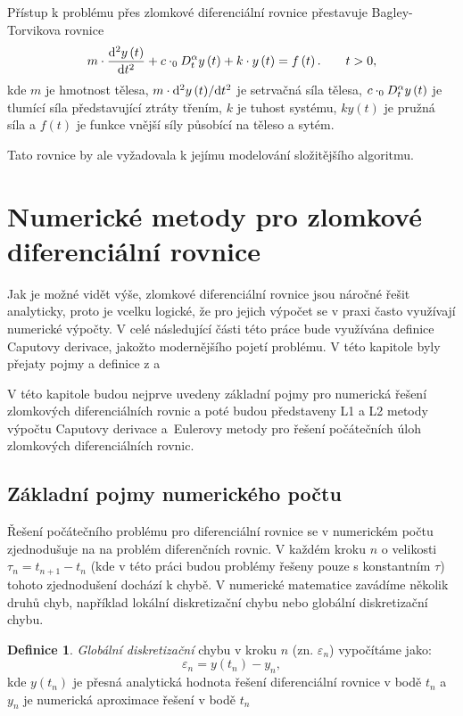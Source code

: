 \documentclass[a4paper,12pt,twoside]{article}
\theoremstyle{definition}
\newtheorem{defin}[veta]{Definice}
\theoremstyle{remark}
\numberwithin{equation}{section}
\numberwithin{table}{section}
\numberwithin{figure}{section}
\newcommand{\dx}[1]{\mathrm{d} #1}
\begin{document}
Přístup k problému přes zlomkové diferenciální rovnice přestavuje Bagley-Torvikova rovnice
\begin{equation}
	m\cdot \frac{\dx ^{2} y\left(t\right)}{\dx t^{2}} + c\cdot _{0}D^{\alpha}_{t} y\left(t\right) +k \cdot y\left(t\right) = f\left(t\right). \qquad t > 0,
\end{equation}
kde $m$ je hmotnost tělesa, $m\cdot {\dx ^{2} y\left(t\right)}/{\dx t^{2}}$ je setrvačná síla tělesa, $c\cdot \space _{0}D^{\alpha}_{t} y\left(t\right)$ je tlumící síla představující ztráty třením, $k$ je tuhost systému, $ky\left(t\right)$ je pružná síla a $f\left(t\right)$ je funkce vnější síly působící na těleso a sytém. \cite{ChenInMechanics}

Tato rovnice by ale vyžadovala k jejímu modelování složitějšího algoritmu.

\section{Numerické metody pro zlomkové diferenciální rovnice}
Jak je možné vidět výše, zlomkové diferenciální rovnice jsou náročné řešit analyticky, proto je vcelku logické, že pro jejich výpočet se v praxi často využívají numerické výpočty. V celé následující části této práce bude využívána definice Caputovy derivace, jakožto modernějšího pojetí problému. V této kapitole byly přejaty pojmy a definice z \cite{NumMetody} a \cite{Cangpin}

V této kapitole budou nejprve uvedeny základní pojmy pro numerická řešení zlomkových diferenciálních rovnic a poté budou  představeny L1 a L2 metody výpočtu Caputovy derivace a~Eulerovy metody pro řešení počátečních úloh zlomkových diferenciálních rovnic.
\subsection{Základní pojmy numerického počtu}
Řešení počátečního problému pro diferenciální rovnice se v numerickém počtu zjednodušuje na na problém diferenčních rovnic. V každém kroku $n$ o velikosti $\tau_{n} = t_{n+1}-t_{n}$ (kde v této práci budou problémy řešeny pouze s konstantním $\tau$) tohoto zjednodušení dochází k chybě. V numerické matematice zavádíme několik druhů chyb, například lokální diskretizační chybu nebo globální diskretizační chybu. 
\begin{defin}\label{GlobalniDiskretizacniChyba}
	\textit{Globální diskretizační} chybu v kroku $n$ (zn. $\varepsilon_{n}$) vypočítáme jako:
	$$\varepsilon_{n} = y\left(t_{n}\right) - y_{n},$$
	kde $y\left(t_{n}\right)$ je přesná analytická hodnota řešení diferenciální rovnice v bodě $t_{n}$ a $y_{n}$ je numerická aproximace řešení v bodě $t_{n}$
\end{defin}
\end{document}
